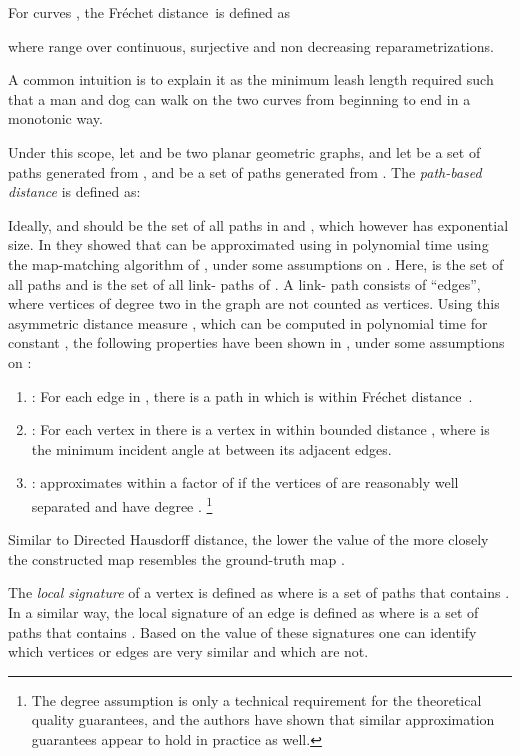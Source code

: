 \documentclass[natbib]{svjour3}                    \smartqed  \usepackage[table]{xcolor}
\newcommand{\Frd}{Fr\'echet distance}
\begin{document}
For curves , the \Frd\ is defined as


where  range over continuous, surjective and non decreasing
repara\-metrizations.

A common intuition is to explain it as the minimum leash length required such that a man and dog can walk on the two curves from beginning to end in a monotonic way.


Under this scope, let  and  be two planar geometric graphs, and let  be a set of paths generated from , and  be a set of paths generated from . The {\em path-based distance} is defined as:



Ideally,  and  should be the set of all paths in  and , which however has exponential size. In \cite{aw-SIGSPATIAL-13} they showed that  can be approximated 
using  in polynomial time using the map-matching algorithm of \cite{aerw-mpm-03}, under some assumptions on . Here,  is the set of all paths and  is the set of all link- paths of . 
A link- path consists of  ``edges'', where vertices of degree two in the graph are not counted as vertices.
Using this asymmetric distance measure , which can be computed in polynomial time
for constant , the following properties have been shown in \cite{aw-SIGSPATIAL-13}, under some assumptions on :

\begin{enumerate}
\item{: For each edge in , there is a path in  which is within \Frd\ .}
\item{: For each vertex  in  there is a vertex in  within bounded distance , where  is the minimum incident angle at  between its adjacent edges.}
\item{:  approximates  within a factor of  if the vertices of  are reasonably well separated and have degree .
\footnote{The degree assumption is only a technical requirement for the theoretical quality guarantees, and the authors have shown \cite{aw-SIGSPATIAL-13} that similar approximation guarantees appear to hold in practice as well.}}
\end{enumerate}

Similar to Directed Hausdorff distance, the lower the value of  the more closely the constructed map  resembles the ground-truth map .

The {\em local signature} of a vertex  is defined as  where  is a set of paths that contains . In a similar way, the local signature of
an edge  is defined as  where  is a set of paths that contains . Based on the value of these signatures one can identify which vertices or edges are very similar and which are not.
\end{document}

